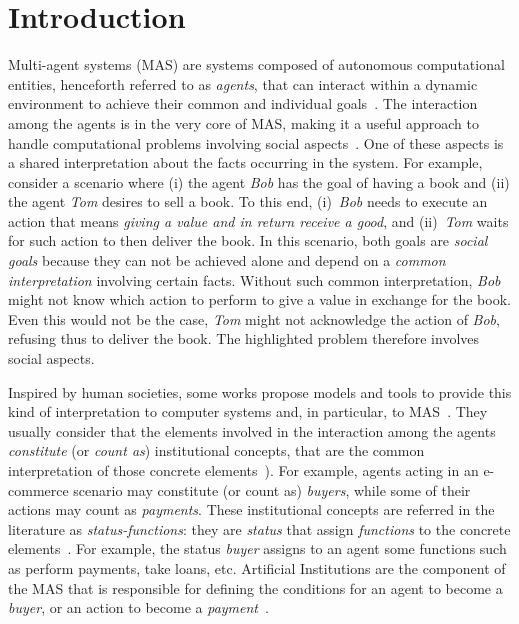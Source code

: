 \documentclass[runningheads]{llncs}
\begin{document}
\section{Introduction}
\label{introduction}

Multi-agent systems (MAS) are systems composed of autonomous computational entities, henceforth referred to as \emph{agents}, that can interact within a dynamic environment to achieve their common and individual goals~\cite{wooldridge2009introduction}. 
The interaction among the agents is in the very core of MAS, making it a useful approach to handle computational problems involving social aspects~\cite{winikoff2012challenges}. One of these aspects is a shared interpretation about the facts occurring in the system.
For example, consider a scenario where (i) the agent \emph{Bob} has the goal of having a book and (ii) the agent \emph{Tom} desires to sell a book. To this end, (i)~\emph{Bob} needs to execute an action that means \emph{giving a value and in return receive a good}, and (ii)~\emph{Tom} waits for such action to then deliver the book. 
In this scenario, both goals are \emph{social goals} because they can not be achieved alone and depend on a \textit{common interpretation} involving certain facts.
Without such common interpretation, \emph{Bob} might not know which action to perform to give a value in exchange for the book. Even this would not be the case, \emph{Tom} might not acknowledge the action of \emph{Bob}, refusing thus to deliver the book. 
The highlighted problem therefore involves social aspects.

Inspired by human societies, some works propose models and tools to provide this kind of interpretation to computer systems and, in particular, to MAS~\cite{Fornara2007}. They usually consider that the elements involved in the interaction among the agents \emph{constitute} (or \emph{count as}) institutional concepts, that are the common interpretation of those concrete elements~\cite{cliffe2006answer,CARDOSO2007,brito2016model,fornara2011specifying}). For example, agents acting in an e-commerce scenario may constitute (or count as) \emph{buyers}, while some of their actions may count as \emph{payments}.
These institutional concepts are referred in the literature as \emph{status-functions}: they are \emph{status} that assign \emph{functions} to the concrete elements~\cite{searle1995construction,searle2010making}. For example, the status \emph{buyer} assigns to an agent some functions such as perform payments, take loans, etc. Artificial Institutions are the component of the MAS that is responsible for defining the conditions for an agent to become a \emph{buyer}, or an action to become a \emph{payment}~\cite{searle1995construction,searle2010making}.
\end{document}
